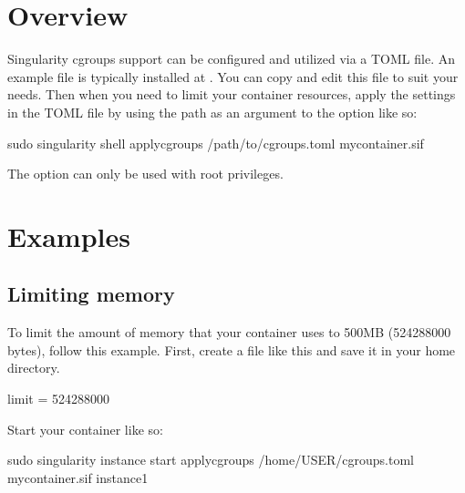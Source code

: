 \documentclass[letterpaper,10pt,english]{sphinxmanual}
\begin{document}
\section{Overview}
\label{\detokenize{cgroups:overview}}
Singularity cgroups support can be configured and utilized via a TOML file. An
example file is typically installed at
.  You can copy and edit this
file to suit your needs.  Then when you need to limit your container resources,
apply the settings in the TOML file by using the path as an argument to the
 option like so:

%
\begin{sphinxVerbatim}[commandchars=\\\{\}]
\PYGZdl{} sudo singularity shell \PYGZhy{}\PYGZhy{}apply\PYGZhy{}cgroups /path/to/cgroups.toml my\PYGZus{}container.sif
\end{sphinxVerbatim}

The  option can only be used with root privileges.


\section{Examples}
\label{\detokenize{cgroups:examples}}

\subsection{Limiting memory}
\label{\detokenize{cgroups:limiting-memory}}
To limit the amount of memory that your container uses to 500MB (524288000
bytes), follow this example.  First, create a  file like this
and save it in your home directory.

%
\begin{sphinxVerbatim}[commandchars=\\\{\}]
[memory]
    limit = 524288000
\end{sphinxVerbatim}

Start your container like so:

%
\begin{sphinxVerbatim}[commandchars=\\\{\}]
\PYGZdl{} sudo singularity instance start \PYGZhy{}\PYGZhy{}apply\PYGZhy{}cgroups /home/\PYGZdl{}USER/cgroups.toml \PYGZbs{}
    my\PYGZus{}container.sif instance1
\end{sphinxVerbatim}
\end{document}

